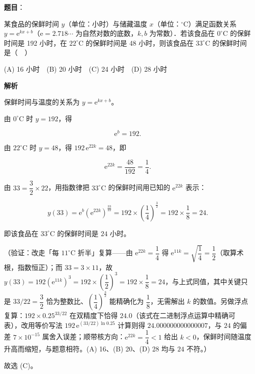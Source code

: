 \begin{answer}

\textbf{题目}：

某食品的保鲜时间 \(y\)（单位：小时）与储藏温度 \(x\)（单位：\(^{\circ}\mathrm{C}\)）满足函数关系 \(y=\mathrm{e}^{kx+b}\)（\(\mathrm{e}=2.718\cdots\) 为自然对数的底数，\(k,b\) 为常数）．若该食品在 \(0^{\circ}\mathrm{C}\) 的保鲜时间是 192 小时，在 \(22^{\circ}\mathrm{C}\) 的保鲜时间是 48 小时，则该食品在 \(33^{\circ}\mathrm{C}\) 的保鲜时间是（　）

(A) 16 小时　(B) 20 小时　(C) 24 小时　(D) 28 小时

\textbf{解析}

保鲜时间与温度的关系为 \(y=\mathrm{e}^{kx+b}\)。

由 \(0^{\circ}\mathrm{C}\) 时 \(y=192\)，得

\nopagebreak[4]
\[
\mathrm{e}^{b}=192.
\]

由 \(22^{\circ}\mathrm{C}\) 时 \(y=48\)，得 \(192\,\mathrm{e}^{22k}=48\)，即

\nopagebreak[4]
\[
\mathrm{e}^{22k}=\dfrac{48}{192}=\dfrac14.
\]

由 \(33=\dfrac32\times22\)，用指数律把 \(33^{\circ}\mathrm{C}\) 的保鲜时间用已知的 \(\mathrm{e}^{22k}\) 表示：

\nopagebreak[4]
\[
y(33)=\mathrm{e}^{b}\left(\mathrm{e}^{22k}\right)^{\frac{33}{22}}
=192\times\left(\dfrac14\right)^{\frac{3}{2}}
=192\times\dfrac18=24.
\]

即该食品在 \(33^{\circ}\mathrm{C}\) 的保鲜时间是 \(24\) 小时。

（验证：改走「每 \(11^{\circ}\mathrm{C}\) 折半」复算——由 \(\mathrm{e}^{22k}=\dfrac14\) 得 \(\mathrm{e}^{11k}=\sqrt{\dfrac14}=\dfrac12\)（取算术根，指数恒正）；而 \(33=3\times11\)，故 \(y(33)=192\left(\mathrm{e}^{11k}\right)^{3}=192\times\left(\dfrac12\right)^{3}=192\times\dfrac18=24\)，与上式同值，其中关键只是 \(33/22=\dfrac32\) 恰为整数比、\(\left(\dfrac14\right)^{\frac{3}{2}}\) 能精确化为 \(\dfrac18\)，无需解出 \(k\) 的数值。另做浮点复算：\(192\times0.25^{33/22}\) 在双精度下恰得 \(24.0\)（该式在二进制浮点运算中精确可表），改用等价写法 \(192\,\mathrm{e}^{(33/22)\ln0.25}\) 计算则得 \(24.000000000000007\)，与 \(24\) 的偏差 \(7\times10^{-15}\) 属舍入误差；顺带核方向：\(\mathrm{e}^{22k}=\dfrac14<1\) 给出 \(k<0\)，保鲜时间随温度升高而缩短，与题意相符。(A) 16、(B) 20、(D) 28 均与 \(24\) 不符。）

故选 (C)。


\end{answer}
